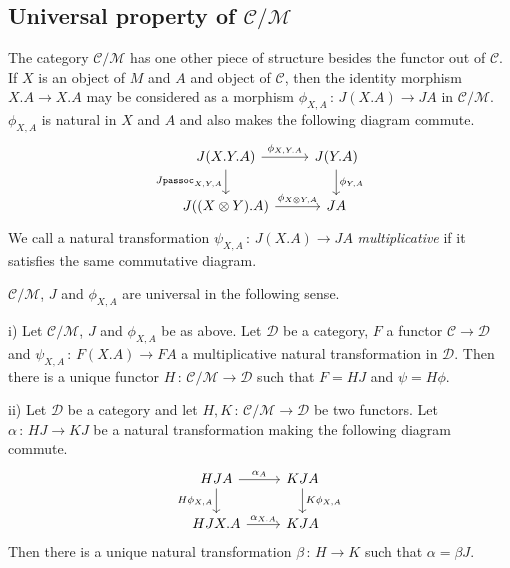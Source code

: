\documentclass{svproc}
\newcommand\C{\mathcal{C}}
\newcommand\D{\mathcal{D}}
\newcommand\M{\mathcal{M}}
\newcommand\from{\,\colon\,}
\newcommand{\passoc}{\texttt{passoc}}
\newcommand\tensor\otimes
\begin{document}
\subsection{Universal property of $\C/\M$}

The category $\C/\M$ has one other piece of structure besides the functor out of $\C$.  
If $X$ is an object of $M$ and $A$ and object of $\C$, then the identity morphism $X.A\to X.A$ may be considered as a morphism $\phi_{X,A}\from J(X.A) \to JA$ in $\C/\M$.  
$\phi_{X,A}$ is natural in $X$ and $A$ and also makes the following diagram commute.
\[
  \begin{tikzcd}
    J(X.Y.A) \arrow[r, "\phi_{X,Y.A}"] \arrow[d, "J\passoc_{X,Y,A}"']
      & J(Y.A) \arrow[d, "\phi_{Y,A}"] \\
    J((X\tensor Y).A) \arrow[r, "\phi_{X\tensor Y,A}"]
      & JA
  \end{tikzcd}
  \]
We call a natural transformation $\psi_{X,A}\from J(X.A) \to JA$ \emph{multiplicative} if it satisfies the same commutative diagram.

$\C/\M$, $J$ and $\phi_{X,A}$ are universal in the following sense.

\begin{proposition}
  i) Let $\C/\M$, $J$ and $\phi_{X,A}$ be as above.  
  Let $\D$ be a category, $F$ a functor $\C\to \D$ and $\psi_{X,A}\from F(X.A) \to FA$ a multiplicative natural transformation in $\D$.  
  Then there is a unique functor $H\from \C/\M\to \D$ such that $F=H J$ and $\psi=H\phi$.

  ii) Let $\D$ be a category and let $H,K\from \C/\M\to \D$ be two functors.  
  Let $\alpha\from HJ \to KJ$ be a natural transformation making the following diagram commute.
  \[
    \begin{tikzcd}
      HJ A \arrow[r, "\alpha_A"] \arrow[d, "H\phi_{X,A}"']
        & KJ A \arrow[d, "K\phi_{X,A}"] \\
      HJ X.A \arrow[r, "\alpha_{X.A}"]
        & KJ A
    \end{tikzcd}
    \]
  Then there is a unique natural transformation $\beta\from H\to K$ such that $\alpha=\beta J$.
  \label{quotient-universal}
\end{proposition}
\end{document}
